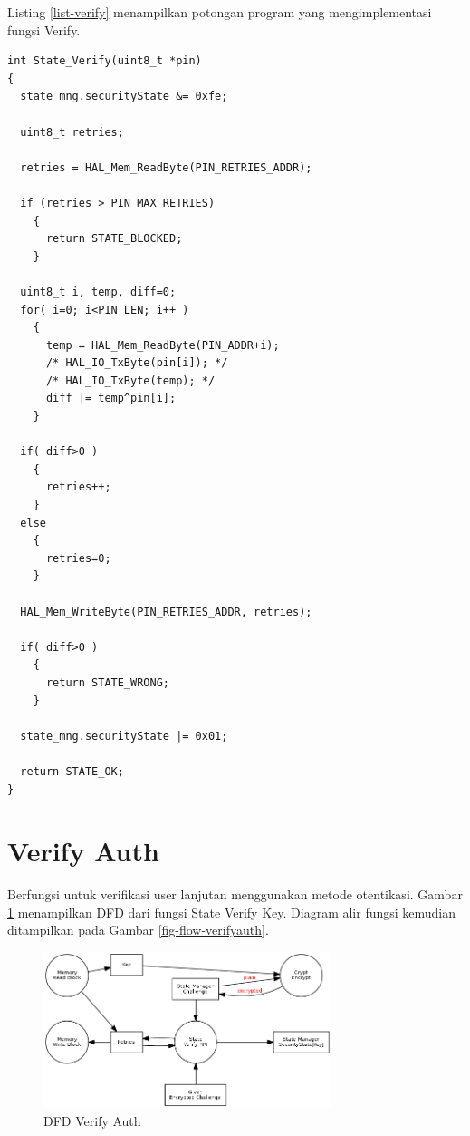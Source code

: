 Listing \ref{list-verify} menampilkan potongan program yang mengimplementasi fungsi Verify.

\begin{lstlisting}[caption={Listing Program Fungsi Verify}, label={list-verify}]
int State_Verify(uint8_t *pin)
{
  state_mng.securityState &= 0xfe;

  uint8_t retries;

  retries = HAL_Mem_ReadByte(PIN_RETRIES_ADDR);

  if (retries > PIN_MAX_RETRIES)
    {
      return STATE_BLOCKED;
    }

  uint8_t i, temp, diff=0;
  for( i=0; i<PIN_LEN; i++ )
    {
      temp = HAL_Mem_ReadByte(PIN_ADDR+i);
      /* HAL_IO_TxByte(pin[i]); */
      /* HAL_IO_TxByte(temp); */
      diff |= temp^pin[i];
    }

  if( diff>0 )
    {
      retries++;
    }
  else
    {
      retries=0;
    }

  HAL_Mem_WriteByte(PIN_RETRIES_ADDR, retries);
  
  if( diff>0 )
    {
      return STATE_WRONG;
    }

  state_mng.securityState |= 0x01;

  return STATE_OK;
}
\end{lstlisting}

\section{Verify Auth}
\label{sec_verifyauth}

Berfungsi untuk verifikasi user lanjutan menggunakan metode otentikasi. Gambar \ref{fig-dfd-verifyauth} menampilkan DFD dari fungsi State Verify Key. Diagram alir fungsi kemudian ditampilkan pada Gambar \ref{fig-flow-verifyauth}. 

\begin{figure}[h]
\centering
\includegraphics[width=0.75\textwidth]{image/state/dfd_verifykey.png}
\caption{DFD Verify Auth}
\label{fig-dfd-verifyauth}
\end{figure}

